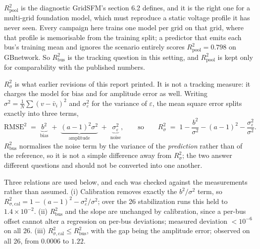 \documentclass[10pt]{article}
\begin{document}
$R^2_{\mathrm{pool}}$ is the diagnostic GridSFM's section 6.2 defines, and it
is the right one for a multi-grid foundation model, which must reproduce a
static voltage profile it has never seen.  Every campaign here trains one model
per grid on that grid, where that profile is memorisable from the training
split; a predictor that emits each bus's training mean and ignores the scenario
entirely scores $R^2_{\mathrm{pool}} = 0.798$ on GBnetwork.  So
$R^2_{\mathrm{bus}}$ is the tracking question in this setting, and
$R^2_{\mathrm{pool}}$ is kept only for comparability with the published
numbers.

$R^2_{\sigma}$ is what earlier revisions of this report printed.  It is not a
tracking measure: it charges the model for bias and for amplitude error as
well.  Writing $\sigma^2=\tfrac{1}{N}\sum(v-\bar v_i)^2$ and
$\sigma_\varepsilon^2$ for the variance of $\varepsilon$, the mean square error
splits exactly into three terms,
\[
  \mathrm{RMSE}^2 \;=\; \underbrace{b^2}_{\text{bias}}
  \;+\;\underbrace{(a-1)^2\sigma^2}_{\text{amplitude}}
  \;+\;\underbrace{\sigma_\varepsilon^2}_{\text{noise}},
  \qquad\text{so}\qquad
  R^2_{\sigma} \;=\; 1-\frac{b^2}{\sigma^2}-(a-1)^2-\frac{\sigma_\varepsilon^2}{\sigma^2}.
\]
$R^2_{\mathrm{bus}}$ normalises the noise term by the variance of the
\emph{prediction} rather than of the reference, so it is not a simple
difference away from $R^2_{\sigma}$; the two answer different questions and
should not be converted into one another.

Three relations are used below, and each was checked against the measurements
rather than assumed.  (i) Calibration removes exactly the $b^2/\sigma^2$ term,
so $R^2_{\sigma,\mathrm{cal}} = 1-(a-1)^2-\sigma_\varepsilon^2/\sigma^2$; over
the 26 stabilization runs this held to $1.4\times10^{-2}$.  (ii)
$R^2_{\mathrm{bus}}$ and the slope are unchanged by calibration, since a
per-bus offset cannot alter a regression on per-bus deviations; measured
deviation $<10^{-6}$ on all 26.  (iii) $R^2_{\sigma,\mathrm{cal}} \le
R^2_{\mathrm{bus}}$, with the gap being the amplitude error; observed on all
26, from $0.0006$ to $1.22$.
\end{document}
